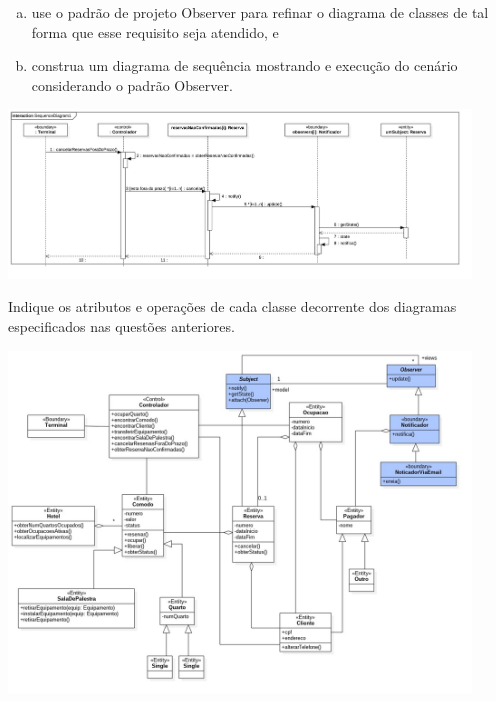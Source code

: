 \documentclass[12pt]{exam}
\begin{document}
\begin{questions}
	    \begin{enumerate}[(a)]
	      \item use o padrão de projeto Observer para refinar o diagrama de classes de tal forma que esse requisito seja atendido, e 
	      \item construa um diagrama de sequência mostrando e execução do cenário considerando o padrão Observer.
	    \end{enumerate}
	    \begin{solution}
	       \includegraphics[width=0.92\textwidth]{imagens/exercicios-hotel-regina-2-solucao-e4.jpg}
	    \end{solution}
	\pagebreak
	\question Indique os atributos e operações de cada classe decorrente dos diagramas especificados nas questões anteriores.
	    \begin{solution}
	       \includegraphics[width=0.92\textwidth]{imagens/exercicios-hotel-regina-2-solucao-e5.jpg}
	    \end{solution}    

  \end{questions}
\end{document}
